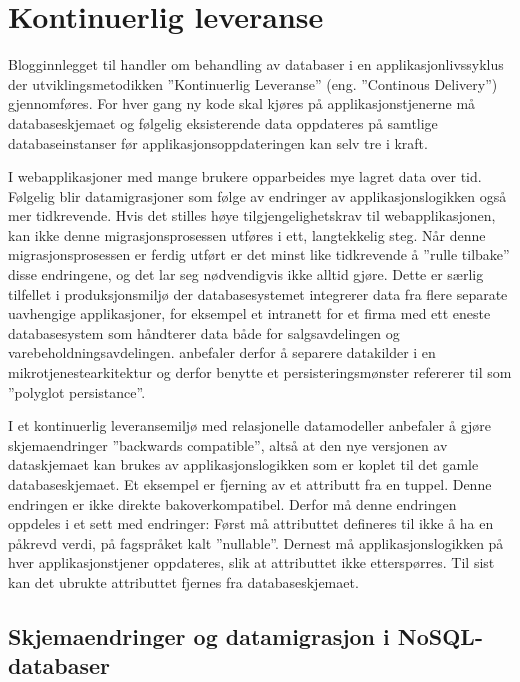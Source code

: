 \section{Kontinuerlig leveranse}

Blogginnlegget til \cite{hauer2015} handler om behandling av databaser i en applikasjonlivssyklus der utviklingsmetodikken ''Kontinuerlig Leveranse'' (eng. ''Continous Delivery'') gjennomføres. For hver gang ny kode skal kjøres på applikasjonstjenerne må databaseskjemaet og følgelig eksisterende data oppdateres på samtlige databaseinstanser før applikasjonsoppdateringen kan selv tre i kraft.

I webapplikasjoner med mange brukere opparbeides mye lagret data over tid. Følgelig blir datamigrasjoner som følge av endringer av applikasjonslogikken også mer tidkrevende. Hvis det stilles høye tilgjengelighetskrav til webapplikasjonen, kan ikke denne migrasjonsprosessen utføres i ett, langtekkelig steg. Når denne migrasjonsprosessen er ferdig utført er det minst like tidkrevende å ''rulle tilbake'' disse endringene, og det lar seg nødvendigvis ikke alltid gjøre. Dette er særlig tilfellet i produksjonsmiljø der databasesystemet integrerer data fra flere separate uavhengige applikasjoner, for eksempel et intranett for et firma med ett eneste databasesystem som håndterer data både for salgsavdelingen og varebeholdningsavdelingen. \cite{hauer2015} anbefaler derfor å separere datakilder i en mikrotjenestearkitektur og derfor benytte et persisteringsmønster \cite{sadalage2013} refererer til som ''polyglot persistance''.

I et kontinuerlig leveransemiljø med relasjonelle datamodeller anbefaler \cite{hauer2015} å gjøre skjemaendringer ''backwards compatible'', altså at den nye versjonen av dataskjemaet kan brukes av applikasjonslogikken som er koplet til det gamle databaseskjemaet. Et eksempel er fjerning av et attributt fra en tuppel. Denne endringen er ikke direkte bakoverkompatibel. Derfor må denne endringen oppdeles i et sett med endringer: Først må attributtet defineres til ikke å ha en påkrevd verdi, på fagspråket kalt ''nullable''. Dernest må applikasjonslogikken på hver applikasjonstjener oppdateres, slik at attributtet ikke etterspørres. Til sist kan det ubrukte attributtet fjernes fra databaseskjemaet.

\subsection{Skjemaendringer og datamigrasjon i NoSQL-databaser}

